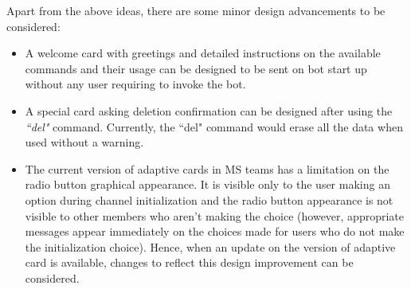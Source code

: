 Apart from the above ideas, there are some minor design advancements to be considered:

\begin{itemize}
\item A welcome card with greetings and detailed instructions on the available commands and their usage can be designed to be sent on bot start up without any user requiring to invoke the bot.

\item A special card asking deletion confirmation can be designed after using the \textit{``del"} command. Currently, the ``del" command would erase all the data when used without a warning.

\item The current version of adaptive cards in MS teams has a limitation on the radio button graphical appearance. It is visible only to the user making an option during channel initialization and the radio button appearance is not visible to other members who aren't making the choice (however, appropriate messages appear immediately on the choices made for users who do not make the initialization choice). Hence, when an update on the version of adaptive card is available, changes to reflect this design improvement can be considered. 
\end{itemize}

